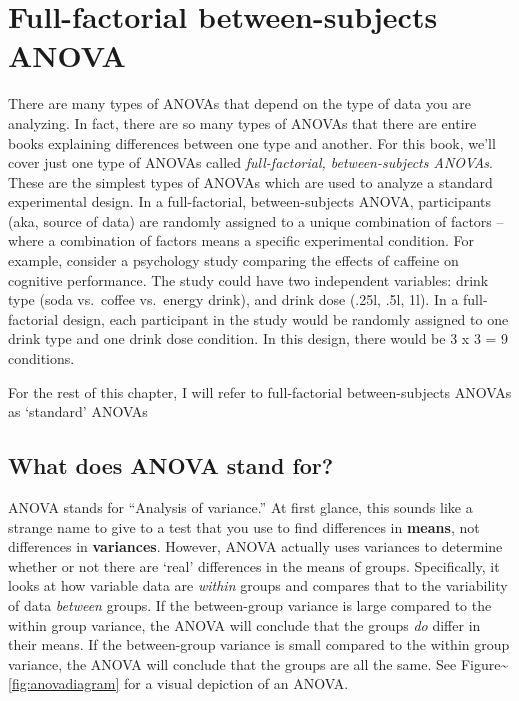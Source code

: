 \documentclass[]{book}
\theoremstyle{definition}
\theoremstyle{definition}
\theoremstyle{remark}
\begin{document}
\section{Full-factorial between-subjects
ANOVA}\label{full-factorial-between-subjects-anova}

There are many types of ANOVAs that depend on the type of data you are
analyzing. In fact, there are so many types of ANOVAs that there are
entire books explaining differences between one type and another. For
this book, we'll cover just one type of ANOVAs called
\emph{full-factorial, between-subjects ANOVAs}. These are the simplest
types of ANOVAs which are used to analyze a standard experimental
design. In a full-factorial, between-subjects ANOVA, participants (aka,
source of data) are randomly assigned to a unique combination of factors
-- where a combination of factors means a specific experimental
condition. For example, consider a psychology study comparing the
effects of caffeine on cognitive performance. The study could have two
independent variables: drink type (soda vs.~coffee vs.~energy drink),
and drink dose (.25l, .5l, 1l). In a full-factorial design, each
participant in the study would be randomly assigned to one drink type
and one drink dose condition. In this design, there would be 3 x 3 = 9
conditions.

For the rest of this chapter, I will refer to full-factorial
between-subjects ANOVAs as `standard' ANOVAs

\subsection{What does ANOVA stand for?}\label{what-does-anova-stand-for}

ANOVA stands for ``Analysis of variance.'' At first glance, this sounds
like a strange name to give to a test that you use to find differences
in \textbf{means}, not differences in \textbf{variances}. However, ANOVA
actually uses variances to determine whether or not there are `real'
differences in the means of groups. Specifically, it looks at how
variable data are \emph{within} groups and compares that to the
variability of data \emph{between} groups. If the between-group variance
is large compared to the within group variance, the ANOVA will conclude
that the groups \emph{do} differ in their means. If the between-group
variance is small compared to the within group variance, the ANOVA will
conclude that the groups are all the same. See
Figure\textasciitilde{}\ref{fig:anovadiagram} for a visual depiction of
an ANOVA.
\end{document}
